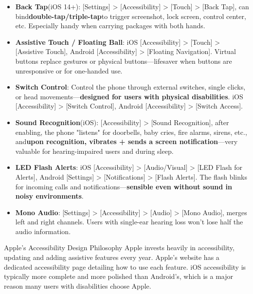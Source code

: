 \begin{itemize}
  \item \textbf{Back Tap}(iOS 14+): [Settings] > [Accessibility] > [Touch] > [Back Tap], can bind\textbf{double-tap/triple-tap}to trigger screenshot, lock screen, control center, etc. Especially handy when carrying packages with both hands.
  \item \textbf{Assistive Touch / Floating Ball}: iOS [Accessibility] > [Touch] > [Assistive Touch], Android [Accessibility] > [Floating Navigation]. Virtual buttons replace gestures or physical buttons—lifesaver when buttons are unresponsive or for one-handed use.
  \item \textbf{Switch Control}: Control the phone through external switches, single clicks, or head movements—\textbf{designed for users with physical disabilities}. iOS [Accessibility] > [Switch Control], Android [Accessibility] > [Switch Access].
  \item \textbf{Sound Recognition}(iOS): [Accessibility] > [Sound Recognition], after enabling, the phone "listens" for doorbells, baby cries, fire alarms, sirens, etc., and\textbf{upon recognition, vibrates + sends a screen notification}—very valuable for hearing-impaired users and during sleep.
  \item \textbf{LED Flash Alerts}: iOS [Accessibility] > [Audio/Visual] > [LED Flash for Alerts], Android [Settings] > [Notifications] > [Flash Alerts]. The flash blinks for incoming calls and notifications—\textbf{sensible even without sound in noisy environments}.
  \item \textbf{Mono Audio}: [Settings] > [Accessibility] > [Audio] > [Mono Audio], merges left and right channels. Users with single-ear hearing loss won't lose half the audio information.
\end{itemize}

\begin{tcbinfo}{Apple's Accessibility Design Philosophy}
Apple invests heavily in accessibility, updating and adding assistive features every year. Apple’s website has a dedicated accessibility page detailing how to use each feature. iOS accessibility is typically more complete and more polished than Android’s, which is a major reason many users with disabilities choose Apple.

\end{tcbinfo}

